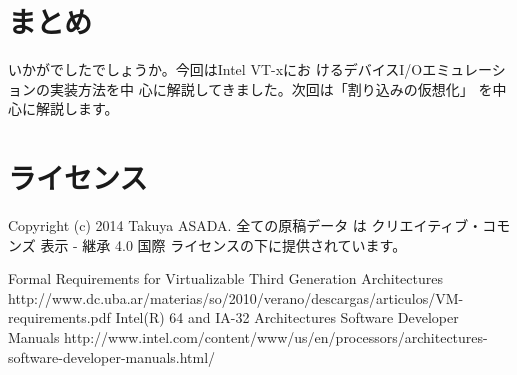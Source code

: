 \documentclass[a4j,12pt]{jarticle}
\begin{document}
\section{まとめ}

 いかがでしたでしょうか。今回はIntel VT-xにお
けるデバイスI/Oエミュレーションの実装方法を中
心に解説してきました。次回は「割り込みの仮想化」
を中心に解説します。

\section{ライセンス}
Copyright (c) 2014 Takuya ASADA.
全ての原稿データ は クリエイティブ・コモンズ 表示 - 継承 4.0 国際 ライセンスの下に提供されています。

\begin{thebibliography}{4}
   Formal Requirements for Virtualizable Third Generation Architectures http://www.dc.uba.ar/materias/so/2010/verano/descargas/articulos/VM-requirements.pdf
   Intel(R) 64 and IA-32 Architectures Software Developer Manuals http://www.intel.com/content/www/us/en/processors/architectures-software-developer-manuals.html/
\end{thebibliography}
\end{document}

